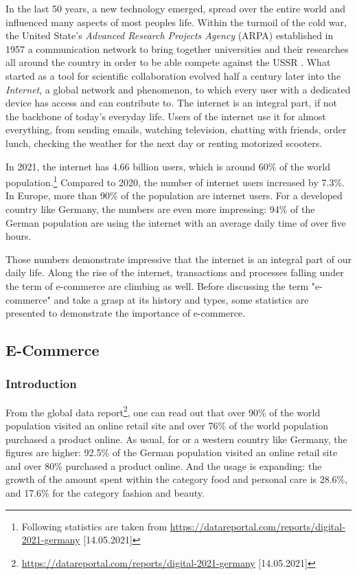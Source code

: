 In the last 50 years, a new technology emerged, spread over the entire world and influenced many aspects of most peoples life.
Within the turmoil of the cold war, the United State's \textit{Advanced Research Projects Agency} (ARPA) established in 1957 a communication network to bring together universities and their researches all around the country in order to be able compete against the USSR \cite{2011Cohen}.
What started as a tool for scientific collaboration evolved half a century later into the \textit{Internet}, a global network and phenomenon, to which every user with a dedicated device has access and can contribute to.
The internet is an integral part, if not the backbone of today's everyday life.
Users of the internet use it for almost everything, from sending emails, watching television, chatting with friends,  order lunch, checking the weather for the next day or renting motorized scooters.

In 2021, the internet has 4.66 billion users, which is around 60\% of the world population.\footnote{Following statistics are taken from \url{https://datareportal.com/reports/digital-2021-germany} [14.05.2021]}
Compared to 2020, the number of internet users increased by 7.3\%.
In Europe, more than 90\% of the population are internet users.
For a developed country like Germany, the numbers are even more impressing:
94\% of the German population are using the internet with an average daily time of over five hours.

Those numbers demonstrate impressive that the internet is an integral part of our daily life.
Along the rise of the internet, transactions and processes falling under the term of e-commerce are climbing as well.
Before discussing the term "e-commerce" and take a grasp at its history and types, some statistics are presented to demonstrate the importance of e-commerce.


\subsection{E-Commerce}
\label{chapter:ecommerce_subchapter}


\subsubsection{Introduction}

From the global data report\footnote{\url{https://datareportal.com/reports/digital-2021-germany} [14.05.2021]}, one can read out that over 90\% of the world population visited an online retail site and over 76\% of the world population purchased a product online.
As usual, for or a western country like Germany, the figures are higher:
92.5\% of the German population visited an online retail site and over 80\% purchased a product online.
And the usage is expanding: the growth of the amount spent within the category food and personal care is 28.6\%, and 17.6\% for the category fashion and beauty.

